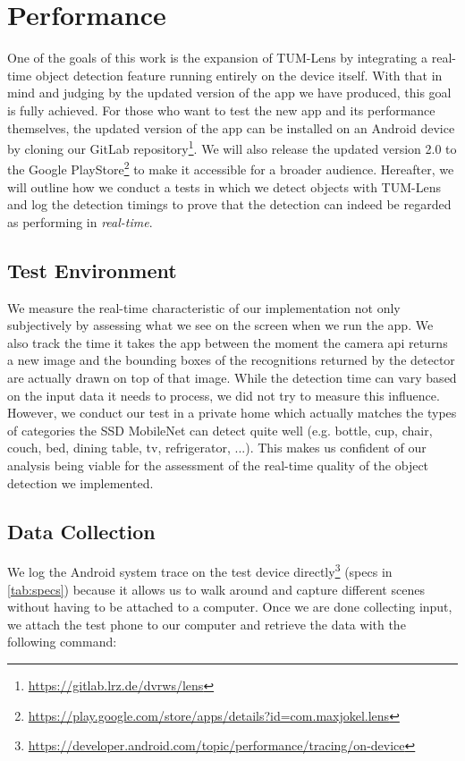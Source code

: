 \documentclass[
			   fontsize=11pt,
               paper=a4,
               bibliography=totoc,
               idxtotoc,
               headsepline,
               footsepline,
               footinclude=false,
               BCOR=12mm,
               DIV=13,
               openany,   %
               ]
               {scrbook}
\begin{document}
\section{Performance} \label{sec:performance}

One of the goals of this work is the expansion of TUM-Lens by integrating a real-time object detection feature running entirely on the device itself. With that in mind and judging by the updated version of the app we have produced, this goal is fully achieved. For those who want to test the new app and its performance themselves, the updated version of the app can be installed on an Android device by cloning our GitLab repository\footnote{\url{https://gitlab.lrz.de/dvrws/lens}}. We will also release the updated version 2.0 to the Google PlayStore\footnote{\url{https://play.google.com/store/apps/details?id=com.maxjokel.lens}} to make it accessible for a broader audience. Hereafter, we will outline how we conduct a tests in which we detect objects with TUM-Lens and log the detection timings to prove that the detection can indeed be regarded as performing in \textit{real-time}.

\subsection{Test Environment}
We measure the real-time characteristic of our implementation not only subjectively by assessing what we see on the screen when we run the app. We also track the time it takes the app between the moment the camera \gls{api} returns a new image and the bounding boxes of the recognitions returned by the detector are actually drawn on top of that image. While the detection time can vary based on the input data it needs to process, we did not try to measure this influence. However, we conduct our test in a private home which actually matches the types of categories the SSD MobileNet can detect quite well (e.g. bottle, cup, chair, couch, bed, dining table, tv, refrigerator, ...). This makes us confident of our analysis being viable for the assessment of the real-time quality of the object detection we implemented.

\subsection{Data Collection}
We log the Android system trace on the test device directly\footnote{\url{https://developer.android.com/topic/performance/tracing/on-device}} (specs in \autoref{tab:specs}) because it allows us to walk around and capture different scenes without having to be attached to a computer. Once we are done collecting input, we attach the test phone to our computer and retrieve the data with the following command:
\end{document}
